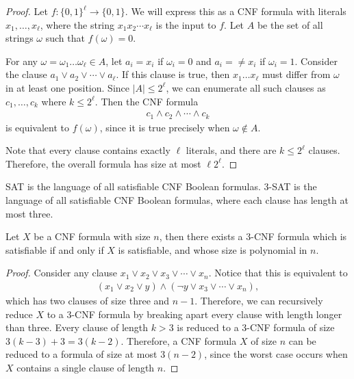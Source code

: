 \begin{proof}
    Let $f: \{0, 1\}^{\ell} \to \{0, 1\}$. We will express this as a CNF formula with literals $x_1, \ldots, x_{\ell}$, where the string $x_1x_2\cdots x_{\ell}$ is the input to $f$. Let $A$ be the set of all strings $\omega$ such that $f(\omega) = 0$.

    For any $\omega = \omega_1\ldots \omega_{\ell} \in A$, let $a_i = x_i$ if $\omega_i = 0$ and $a_i = \neq x_i$ if $\omega_i = 1$. Consider the clause $a_1 \lor a_2 \lor \cdots \lor a_{\ell}$. If this clause is true, then $x_1\ldots x_{\ell}$ must differ from $\omega$ in at least one position. Since $|A| \leq 2^{\ell}$, we can enumerate all such clauses as $c_1, \ldots, c_{k}$ where $k \leq 2^{\ell}$. Then the CNF formula
    \begin{align*}
        c_1 \land c_2 \land \cdots \land c_{k}
    \end{align*}
    is equivalent to $f(\omega)$, since it is true precisely when $\omega \not\in A$.

    Note that every clause contains exactly $\ell$ literals, and there are $k \leq 2^{\ell}$ clauses. Therefore, the overall formula has size at most $\ell 2^{\ell}$.
\end{proof}

\begin{defn}
    SAT is the language of all satisfiable CNF Boolean formulas. 3-SAT is the language of all satisfiable CNF Boolean formulas, where each clause has length at most three.
\end{defn}

\begin{lemma}\label{CNF-to-3-CNF}
    Let $X$ be a CNF formula with size $n$, then there exists a 3-CNF formula which is satisfiable if and only if $X$ is satisfiable, and whose size is polynomial in $n$.
\end{lemma}

\begin{proof}
    Consider any clause $x_1 \lor x_2 \lor x_3 \lor \cdots \lor x_n$. Notice that this is equivalent to
    \begin{align*}
        (x_1 \lor x_2 \lor y) \land (\neg y \lor x_3 \lor \cdots \lor x_n),
    \end{align*}
    which has two clauses of size three and $n-1$. Therefore, we can recursively reduce $X$ to a 3-CNF formula by breaking apart every clause with length longer than three. Every clause of length $k > 3$ is reduced to a 3-CNF formula of size $3(k-3) + 3 = 3(k-2)$. Therefore, a CNF formula $X$ of size $n$ can be reduced to a formula of size at most $3(n-2)$, since the worst case occurs when $X$ contains a single clause of length $n$.
\end{proof}

